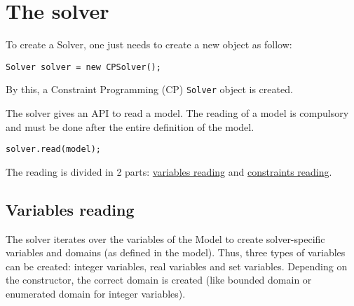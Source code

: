 \label{solver}
\hypertarget{solver}{}


\chapter{The solver}\label{solver:thesolver}\hypertarget{solver:thesolver}{}




To create a \gls{Solver}, one just needs to create a new object as follow:
\begin{lstlisting}
Solver solver = new CPSolver();
\end{lstlisting}
By this, a Constraint Programming (CP) {\tt Solver} object is created. 

The solver gives an API to read a model. The reading of a model is compulsory and must be done after the entire definition of the model. 
\begin{lstlisting}
solver.read(model);
\end{lstlisting}
The reading is divided in 2 parts: \hyperlink{solver:variablesreading}{variables reading} and \hyperlink{solver:constraintsreading}{constraints reading}.

\section{Variables reading}\label{solver:variablesreading}\hypertarget{solver:variablesreading}{}
The solver iterates over the variables of the Model to create solver-specific variables and domains (as defined in the model). 
Thus, three types of variables can be created: integer variables, real variables and set variables. 
Depending on the constructor, the correct domain is created (like bounded domain or enumerated domain for integer variables). 

